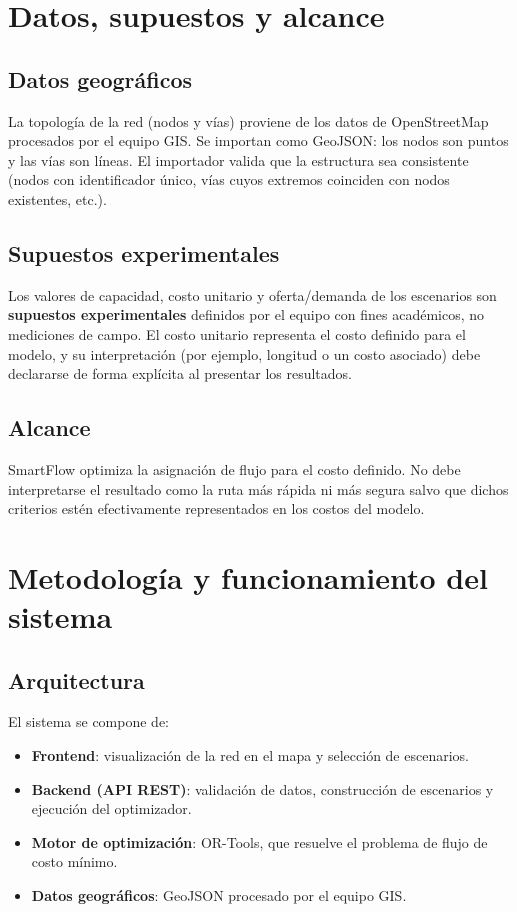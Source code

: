 \documentclass{article}
\begin{document}
\section{Datos, supuestos y alcance}

\subsection{Datos geográficos}
La topología de la red (nodos y vías) proviene de los datos de OpenStreetMap
procesados por el equipo GIS. Se importan como GeoJSON: los nodos son puntos y
las vías son líneas. El importador valida que la estructura sea consistente
(nodos con identificador único, vías cuyos extremos coinciden con nodos
existentes, etc.).

\subsection{Supuestos experimentales}
Los valores de capacidad, costo unitario y oferta/demanda de los escenarios son
\textbf{supuestos experimentales} definidos por el equipo con fines
académicos, no mediciones de campo. El costo unitario representa el costo
definido para el modelo, y su interpretación (por ejemplo, longitud o un costo
asociado) debe declararse de forma explícita al presentar los resultados.

\subsection{Alcance}
SmartFlow optimiza la asignación de flujo para el costo definido. No debe
interpretarse el resultado como la ruta más rápida ni más segura salvo que
dichos criterios estén efectivamente representados en los costos del modelo.

\section{Metodología y funcionamiento del sistema}

\subsection{Arquitectura}
El sistema se compone de:
\begin{itemize}
    \item \textbf{Frontend}: visualización de la red en el mapa y selección de
          escenarios.
    \item \textbf{Backend (API REST)}: validación de datos, construcción de
          escenarios y ejecución del optimizador.
    \item \textbf{Motor de optimización}: OR-Tools, que resuelve el problema de
          flujo de costo mínimo.
    \item \textbf{Datos geográficos}: GeoJSON procesado por el equipo GIS.
\end{itemize}
\end{document}

